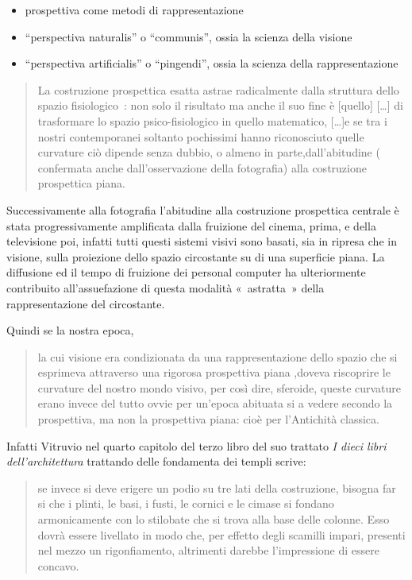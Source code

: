 \begin{itemize}
  \item prospettiva come metodi di rappresentazione\\
  \item “perspectiva naturalis” o “communis”, ossia la scienza della visione
  \item “perspectiva artificialis” o “pingendi”, ossia la scienza della rappresentazione
\end{itemize}

\begin{quote}
La costruzione prospettica esatta astrae radicalmente dalla struttura dello
spazio fisiologico : non solo il risultato ma anche il suo fine è [quello] [\ldots]
di trasformare lo spazio psico-fisiologico in quello matematico, [\ldots]e se tra i
nostri contemporanei soltanto pochissimi hanno riconosciuto quelle curvature ciò
dipende senza dubbio, o almeno in parte,dall’abitudine ( confermata anche
dall’osservazione della fotografia) alla costruzione prospettica piana.
\end{quote}

Successivamente alla fotografia l’abitudine alla costruzione prospettica centrale
è stata progressivamente amplificata  dalla fruizione del cinema, prima, e
della televisione poi, infatti tutti questi sistemi visivi sono basati, sia in
ripresa che in visione, sulla proiezione dello spazio circostante su di una
superficie piana. La diffusione ed il tempo di fruizione dei personal computer
ha ulteriormente contribuito all’assuefazione di questa modalità « astratta »
della rappresentazione del circostante.

Quindi se la nostra epoca,

\begin{quote}
la cui visione era condizionata da una
rappresentazione dello spazio che si esprimeva attraverso una rigorosa
prospettiva piana ,doveva riscoprire le curvature del nostro mondo visivo, per
così dire, sferoide, queste curvature erano invece del tutto ovvie per un’epoca
abituata si a vedere  secondo la prospettiva, ma non la prospettiva piana: cioè
per l’Antichità classica.
\end{quote}

Infatti Vitruvio nel quarto capitolo del terzo libro  del suo trattato
\emph{I dieci libri dell’architettura} trattando delle fondamenta dei templi
scrive:

\begin{quote}
se invece si deve erigere un podio su tre lati della costruzione, bisogna far si che i
plinti, le basi, i fusti, le cornici e le cimase si fondano armonicamente con
lo stilobate che si trova alla base delle colonne. Esso dovrà essere livellato
in modo che, per effetto degli scamilli impari, presenti nel mezzo un
rigonfiamento, altrimenti darebbe l’impressione di essere concavo.
\end{quote}

